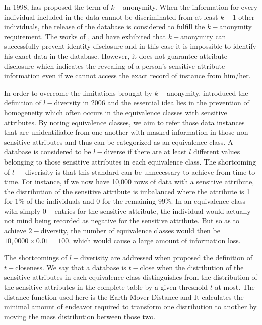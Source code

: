 In 1998, \citet{sweeney2002k} has proposed the term of $k-$anonymity. When the information for every individual included in the data
cannot be discriminated from at least $k-1$ other individuals, the release of the database is considered to fulfill the
$k-$anonymity requirement. The works of \citet{machanavajjhala2007diversity}, \citet{truta2006privacy} and \citet{xiao2006personalized}
have exhibited that $k-$anonymity can successfully prevent identity disclosure and in this case it is impossible to identify
his exact data in the database. However, it does not guarantee attribute disclosure which indicates the revealing of a person's
sensitive attribute information even if we cannot access the exact record of instance from him/her. 

In order to overcome the limitations brought by $k-$anonymity, \citet{machanavajjhala2007diversity} introduced the definition of $l-$diversity in 2006 and the
essential idea lies in the prevention of homogeneity which often occurs in the equivalence classes with sensitive attributes.
By noting equivalence classes, we aim to refer those data instances that are unidentifiable from one another with masked information
in those non-sensitive attributes and thus can be categorized as an equivalence class. A database is considered to be $l-$diverse
if there are at least $l$ different values belonging to those sensitive attributes in each equivalence class. The shortcoming of $l-$ diverisity
is that this standard can be unnecessary to achieve from time to time. For instance, if we now have 10,000 rows of data with a sensitive attribute,
the distribution of the sensitive attribute is imbalanced where the attribute is 1 for $1\%$ of the individuals and 0 for the remaining
$99\%$. In an equivalence class with simply $0-$entries for the sensitive attribute, the individual would actually not mind being
recorded as negative for the sensitive attribute. But so as to achieve $2-$diversity, the number of equivalence classes would
then be $10,0000 \times 0.01 = 100$, which would cause a large amount of information loss.

The shortcomings of $l-$diverisity are addressed when \citet{xiao2006personalized} proposed the definition of $t-$closeness. We say that a database
is $t-$close when the distribution of the sensitive attributes in each equivalence class distinguishes from the distribution of the sensitive attributes 
in the complete table by a given threshold $t$ at most. The distance function used here is the Earth Mover Distance \citep{rubner2000earth} and It
calculates the minimal amount of endeavor required to transform one distribution to another by moving the mass distribution between those two.

